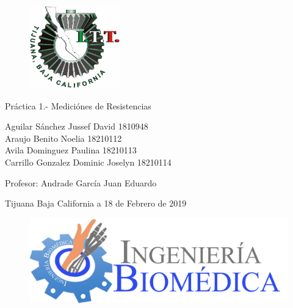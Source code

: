 \documentclass[11pt,a4paper]{report}
\begin{document}
	
	\begin{titlepage}
		
		\begin{center}
			\vspace*{-1in}
			\begin{figure}[t]
				\begin{flushleft}
					\includegraphics[width=4cm]{LOGO_ITT_2005}
					
				\end{flushleft}
			\end{figure}
		
			
				\begin{huge}
					\vspace*{3cm}
					Pr\'actica 1.- Medici\'ones de Resistencias\\
					\vspace*{3cm}
				\end{huge}
			\begin{Large}
			
			Aguilar S\'anchez Jussef David \hspace{3cm}1810948\\
			Araujo Benito Noelia \hspace{4.4cm} 18210112\\
			Avila Dominguez Paulina \hspace{3.5cm} 18210113\\
			Carrillo Gonzalez Dominic Joselyn \hspace{1.8cm}18210114\\
			
			
			\vspace*{4cm}
		
				Profesor: Andrade Garc\'ia Juan Eduardo \\
			
			\vspace*{4cm}
			
				Tijuana Baja California a 18 de Febrero de 2019 \\
			\end{Large}
			
			\begin{figure}[b]
				\begin{flushright}
					\includegraphics[width=0.4\linewidth]{BIOMEDICA_HEADING1-2048x672}
					

\end{flushright}
\end{figure}
\end{center}
\end{titlepage}
\end{document}
